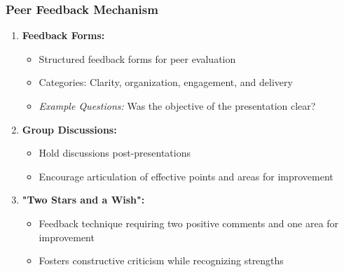 \documentclass[aspectratio=169]{beamer}
\begin{document}
\begin{frame}[fragile]
    \frametitle{Peer Feedback Mechanism}
    \begin{enumerate}
        \item \textbf{Feedback Forms:}
            \begin{itemize}
                \item Structured feedback forms for peer evaluation
                \item Categories: Clarity, organization, engagement, and delivery
                \item \textit{Example Questions:} Was the objective of the presentation clear?
            \end{itemize}
        \item \textbf{Group Discussions:}
            \begin{itemize}
                \item Hold discussions post-presentations 
                \item Encourage articulation of effective points and areas for improvement
            \end{itemize}
        \item \textbf{"Two Stars and a Wish":}
            \begin{itemize}
                \item Feedback technique requiring two positive comments and one area for improvement
                \item Fosters constructive criticism while recognizing strengths
            \end{itemize}
    \end{enumerate}
\end{frame}
\end{document}

